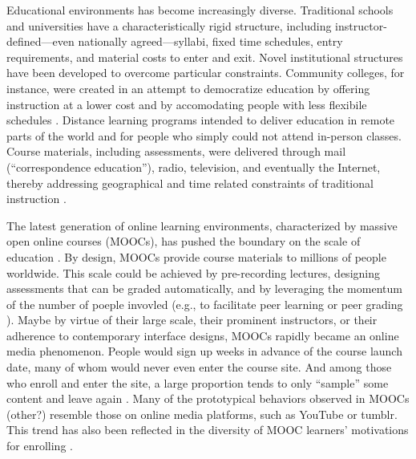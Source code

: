 \documentclass{sigchi}\usepackage[]{graphicx}\usepackage[]{color}
\begin{document}
Educational environments has become increasingly diverse. Traditional schools and universities have a characteristically rigid structure, including instructor-defined---even nationally agreed---syllabi, fixed time schedules, entry requirements, and material costs to enter and exit. Novel institutional structures have been developed to overcome particular constraints. Community colleges, for instance, were created in an attempt to democratize education by offering instruction at a lower cost and by accomodating people with less flexibile schedules \cite{goldrick2010challenges}. Distance learning programs intended to deliver education in remote parts of the world and for people who simply could not attend in-person classes. Course materials, including assessments, were delivered through mail (``correspondence education''), radio, television, and eventually the Internet, thereby addressing geographical and time related constraints of traditional instruction \cite{moore1996distance}.

The latest generation of online learning environments, characterized by massive open online courses (MOOCs), has pushed the boundary on the scale of education \cite{waldrop2013campus}. By design, MOOCs provide course materials to millions of people worldwide. This scale could be achieved by pre-recording lectures, designing assessments that can be graded automatically, and by leveraging the momentum of the number of poeple invovled (e.g., to facilitate peer learning or peer grading \cite{kulkarni2013peer,cambre2014talkabout}). Maybe by virtue of their large scale, their prominent instructors, or their adherence to contemporary interface designs, MOOCs rapidly became an online media phenomenon. People would sign up weeks in advance of the course launch date, many of whom would never even enter the course site. And among those who enroll and enter the site, a large proportion tends to only ``sample'' some content and leave again \cite{kizilcec2013deconstructing}. Many of the prototypical behaviors observed in MOOCs \cite{kizilcec2013deconstructing,breslow2013studying} (other?) resemble those on online media platforms, such as YouTube or tumblr. This trend has also been reflected in the diversity of MOOC learners' motivations for enrolling \cite{kizilcec2015motivation}.
\end{document}
